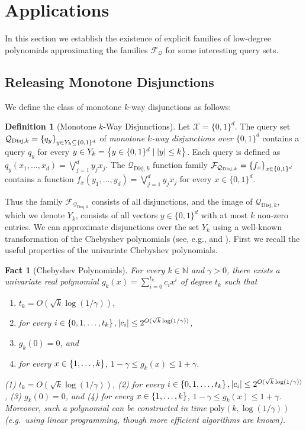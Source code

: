 \documentclass[11pt]{article}
\newcommand\N{\mathbb{N}}
\newcommand\cF{\mathcal{F}}
\newcommand\cQ{\mathcal{Q}}
\newcommand\cX{\mathcal{X}}
\newcommand\poly{\mathrm{poly}}
\newcommand\bits{\{0,1\}}
\newtheorem{fact}[theorem]{Fact}
\theoremstyle{definition}
\newtheorem{definition}[theorem]{Definition}
\begin{document}
\section{Applications} \label{sec:apps}
In this section we establish the existence of explicit families of low-degree polynomials approximating the families $\cF_{\cQ}$ for some interesting query sets.
\subsection{Releasing Monotone Disjunctions} \label{sec:monotonedisj}

We define the class of monotone $k$-way disjunctions as follows:

\begin{definition}[Monotone $k$-Way Disjunctions] \label{def:monotonedisj}Let $\cX = \bits^d$.
The query set $\cQ_{\mathrm{Disj}, k} = \set{q_y}_{y \in Y_k \subseteq \bits^d}$ of \emph{monotone $k$-way disjunctions over $\bits^d$} contains a query $q_y$ for every $y \in Y_k = \set{y \in \bits^d \mid |y| \leq k}$.  Each query is defined as $q_y(x_1, \dots, x_d) = \bigvee_{j =1}^{d} y_j x_j$.
The $\cQ_{\mathrm{Disj}, k}$ function family $\cF_{\cQ_{\mathrm{Disj}, k}} = \set{f_x}_{x \in \bits^d}$ contains a function
$f_x(y_1, \dots, y_d) = \bigvee_{j=1}^{d} y_j x_j$
for every $x \in \bits^d$.
\end{definition}

\ifnum{}
Thus the family $\cF_{\cQ_{\mathrm{Disj}, k}}$ consists of all disjunctions, and the image of $\cQ_{\mathrm{Disj}, k}$, which we denote $Y_k$, consists of all vectors $y \in \bits^d$ with at most $k$ non-zero entries.  We can approximate disjunctions over the set $Y_k$ using a well-known transformation of the Chebyshev polynomials (see, e.g., \cite[Theorem 8]{KlivansSe04} and \cite[Claim 5.4]{HardtRoSe12}).  First we recall the useful properties of the univariate Chebyshev polynomials.

\begin{fact} [Chebyshev Polynomials] \label{lemma:chebyshev}
For every $k \in \N$ and $\gamma > 0$, there exists a univariate real polynomial $g_k(x) = \sum_{i=0}^{t_k} c_i x^i$ of degree $t_k$ such that 
\ifnum{}
\begin{enumerate}
\item $t_k = O(\sqrt{k} \log(1/\gamma))$,
\item for every $i \in \left\{0,1,\dots,t_k\right\}, |c_i| \leq  2^{O(\sqrt{k} \log(1/\gamma))}$,
\item $g_k(0) = 0$, and
\item for every $x \in \left\{1, \dots, k\right\}$, $1-\gamma \leq g_k(x) \leq 1+\gamma$.
\end{enumerate}
\else
(1) $t_k = O(\sqrt{k} \log(1/\gamma))$, (2) for every $i \in \left\{0,1,\dots,t_k\right\}, |c_i| \leq  2^{O(\sqrt{k} \log(1/\gamma))}$, (3) $g_k(0) = 0$, and (4) for every $x \in \left\{1, \dots, k\right\}$, $1-\gamma \leq g_k(x) \leq 1+\gamma$.
\fi
Moreover, such a polynomial can be constructed in time $\poly(k, \log(1/\gamma))$ (e.g.~using linear programming, though more efficient algorithms are known).
\end{fact}
\end{document}
